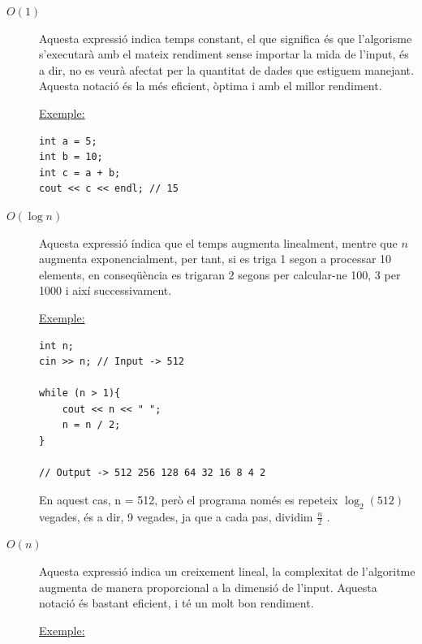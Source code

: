 \begin{description}

\item[$O(1)$]

Aquesta expressió indica temps constant, el que significa és que l'algorisme s'executarà amb el mateix rendiment sense importar la mida de l'input, és a dir, no es veurà afectat per la quantitat de dades que estiguem manejant.
Aquesta notació és la més eficient, òptima i amb el millor rendiment. \newline

\underline{Exemple:} \newline

\begin{lstlisting}
int a = 5;
int b = 10;
int c = a + b;
cout << c << endl; // 15
\end{lstlisting}

\newpage

\item[$O(\log n)$]
Aquesta expressió índica que el temps augmenta linealment, mentre que $n$ augmenta exponencialment, per tant, si es triga 1 segon a processar 10 elements, en conseqüència es trigaran 2 segons per calcular-ne 100, 3 per 1000 i així successivament. \newline

\underline{Exemple:} \newline

\begin{lstlisting}
int n;
cin >> n; // Input -> 512

while (n > 1){
    cout << n << " ";
    n = n / 2;
}

// Output -> 512 256 128 64 32 16 8 4 2
\end{lstlisting}

En aquest cas, n = 512, però el programa només es repeteix $\log_{2}(512)$ vegades, és a dir, 9 vegades, ja que a cada pas, dividim $\frac{n}{2}$ . \newline

\item[$O(n)$]

Aquesta expressió indica un creixement lineal, la complexitat de l'algoritme augmenta de manera proporcional a la dimensió de l'input.
Aquesta notació és bastant eficient, i té un molt bon rendiment. \newline

\underline{Exemple:} \newline


\end{description}
